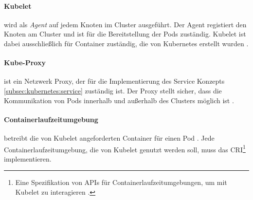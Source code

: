\paragraph{Kubelet} wird als \emph{Agent} auf jedem Knoten im Cluster ausgeführt. 
Der Agent registiert den Knoten am Cluster und ist für die Bereitstellung der Pods zuständig.
Kubelet ist dabei ausschließlich für Container zuständig, die von Kubernetes erstellt wurden \cite{kubernetesComponents}.

\paragraph{Kube-Proxy} ist ein Netzwerk Proxy, der für die Implementierung des Service Konzepts \ref{subsec:kubernetes:service}
zuständig ist. 
Der Proxy stellt sicher, dass die Kommunikation von Pods innerhalb und außerhalb des Clusters möglich ist \cite{kubernetesComponents}.

\paragraph{Containerlaufzeitumgebung} betreibt die von Kubelet angeforderten Container für einen Pod \cite{kubernetesComponents}. 
Jede Containerlaufzeitumgebung, die von Kubelet genutzt werden soll, muss das 
\ac{CRI}\footnote{Eine Spezifikation von APIs für Containerlaufzeitumgebungen, um mit Kubelet zu interagieren \cite{cri}.} implementieren.
